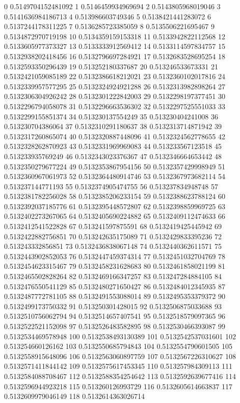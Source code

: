 0 0.5149704152481092
1 0.5146459934969694
2 0.5143805968019046
3 0.5141636984186713
4 0.513986603749346
5 0.5138421441283072
6 0.5137244178311225
7 0.5136285723385059
8 0.5135506221695467
9 0.5134872970719198
10 0.5134359159153318
11 0.5133942822112568
12 0.5133605977373327
13 0.5133333912569412
14 0.5133114597834757
15 0.5132938202418456
16 0.5132796697284921
17 0.5132683528695254
18 0.5132593350296439
19 0.513252180337687
20 0.513246533673331
21 0.5132421059085189
22 0.5132386618212021
23 0.5132360102017816
24 0.5132339957577295
25 0.5132324924921288
26 0.5132313982898264
27 0.5132306304926242
28 0.5132301222842003
29 0.5132298197377451
30 0.5132296794058078
31 0.5132296663536302
32 0.5132297525551033
33 0.5132299155851374
34 0.513230137554249
35 0.513230404241008
36 0.513230704386064
37 0.5132310291180637
38 0.5132313714871942
39 0.5132317260865074
40 0.5132320887448096
41 0.5132324562778655
42 0.5132328262870923
43 0.5132331969969083
44 0.513233567123518
45 0.513233935769249
46 0.5132343023376367
47 0.5132346664653442
48 0.5132350279677224
49 0.5132353867954156
50 0.5132357429998949
51 0.5132360967061973
52 0.5132364480914746
53 0.5132367973682114
54 0.513237144771193
55 0.5132374905474755
56 0.513237834948748
57 0.5132381782256028
58 0.5132385206233154
59 0.5132388623788124
60 0.5132392037185776
61 0.5132395448572807
62 0.5132398859969725
63 0.5132402273267065
64 0.5132405690224882
65 0.5132409112474633
66 0.5132412541522828
67 0.513241597875591
68 0.5132419425445942
69 0.5132422882756851
70 0.513242635175089
71 0.5132429833395236
72 0.513243332856851
73 0.5132436838067148
74 0.5132440362611571
75 0.5132443902852053
76 0.5132447459374314
77 0.5132451032704769
78 0.5132454623315467
79 0.5132458231628683
80 0.5132461858021199
81 0.5132465502828264
82 0.5132469166347257
83 0.513247284884105
84 0.5132476550541129
85 0.5132480271650427
86 0.5132484012345935
87 0.5132487772781105
88 0.5132491553088014
89 0.5132495353379372
90 0.5132499173750332
91 0.513250301428015
92 0.5132506875033688
93 0.5132510756062794
94 0.5132514657407541
95 0.5132518579097365
96 0.5132522521152098
97 0.5132526483582895
98 0.5132530466393087
99 0.5132534469578948
100 0.5132538493130389
101 0.5132542537031601
102 0.513254660126162
103 0.5132550685794843
104 0.5132554790601505
105 0.5132558915648096
106 0.5132563060897759
107 0.5132567226310627
108 0.5132571411844142
109 0.5132575617453345
110 0.513257984309113
111 0.5132584088708467
112 0.5132588354254642
113 0.5132592639677416
114 0.5132596944923218
115 0.513260126993729
116 0.5132605614663837
117 0.5132609979046149
118 0.5132614363026714

